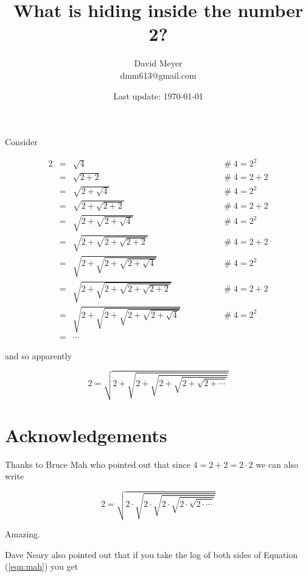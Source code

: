 \documentclass[11pt, oneside]{article}
\title{What is hiding inside the number 2?}
\author{David Meyer \\ dmm613@gmail.com}
\date{Last update: \today}
\theoremstyle{definition}
\begin{document}
\maketitle

\noindent
Consider

\begin{equation*}
\begin{array}{llll}
2 
&=& \sqrt{4}											&\qquad \qquad \mathrel{\#} 4 = 2^2 \\
[10pt]
&=& \sqrt{2+2}											&\qquad \qquad \mathrel{\#} 4 = 2+2 \\
[10pt]
&=& \sqrt{2+ \sqrt{4}}									&\qquad \qquad \mathrel{\#} 4 = 2^2 \\
[10pt]
&=& \sqrt{2+ \sqrt{2+2}}								&\qquad \qquad \mathrel{\#} 4 = 2+2 \\
[10pt]
&=& \sqrt{2+ \sqrt{2+\sqrt{4}}}							&\qquad \qquad \mathrel{\#} 4 = 2^2 \\
[10pt]
&=& \sqrt{2+ \sqrt{2+\sqrt{2+2}}}						&\qquad \qquad \mathrel{\#} 4 = 2+2 \\
[5pt]
&=& \sqrt{2+ \sqrt{2+\sqrt{2+\sqrt{4}}}}				&\qquad \qquad \mathrel{\#} 4 = 2^2 \\
[5pt]
&=& \sqrt{2+ \sqrt{2+\sqrt{2+\sqrt{2+2}}}}				&\qquad \qquad \mathrel{\#} 4 = 2+2 \\
[5pt]
&=& \sqrt{2+ \sqrt{2+\sqrt{2+\sqrt{2+\sqrt{4}}}}}		&\qquad \qquad \mathrel{\#} 4 = 2^2 \\
[10pt]
&=& \cdots
\end{array}
\end{equation*}

\noindent
and so apparently 

\begin{equation*}
2 =  \sqrt{2+ \sqrt{2+\sqrt{2+\sqrt{2+\sqrt{2 + \cdots}}}}}
\end{equation*}
%
%
%
\section*{Acknowledgements}
Thanks to Bruce Mah who pointed out that since $4 = 2 + 2 = 2 \cdot2$
we can also write

\begin{equation}
2 = \sqrt{2 \cdot \sqrt{2 \cdot \sqrt{2 \cdot \sqrt{2 \cdot \sqrt{2 \cdot \cdots}}}}}
\label{eqn:mah}
\end{equation}

\noindent
Amazing.

\bigskip
\noindent
Dave Neary also pointed out that if you take the log of both sides 
of Equation (\ref{eqn:mah}) you get
\end{document}
